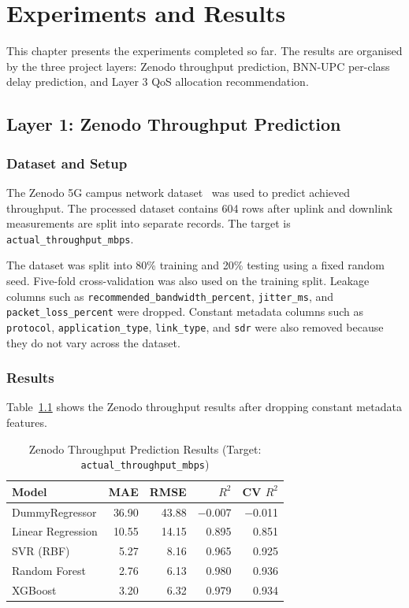 \documentclass[a4paper,12pt]{Classes/RoboticsLaTeX}
\begin{document}
\chapter{Experiments and Results}
\label{chap:results}

This chapter presents the experiments completed so far. The results are organised by the three project layers: Zenodo throughput prediction, BNN-UPC per-class delay prediction, and Layer 3 QoS allocation recommendation.

\section{Layer 1: Zenodo Throughput Prediction}

\subsection{Dataset and Setup}

The Zenodo 5G campus network dataset~\cite{raffeck2024zenodo} was used to predict achieved throughput. The processed dataset contains 604 rows after uplink and downlink measurements are split into separate records. The target is \texttt{actual\_throughput\_mbps}.

The dataset was split into 80\% training and 20\% testing using a fixed random seed. Five-fold cross-validation was also used on the training split. Leakage columns such as \texttt{recommended\_bandwidth\_percent}, \texttt{jitter\_ms}, and \texttt{packet\_loss\_percent} were dropped. Constant metadata columns such as \texttt{protocol}, \texttt{application\_type}, \texttt{link\_type}, and \texttt{sdr} were also removed because they do not vary across the dataset.

\subsection{Results}

Table~\ref{tab:zenodo_results} shows the Zenodo throughput results after dropping constant metadata features.

\begin{table}[H]
\centering
\caption[Zenodo Throughput Prediction Results]{Zenodo Throughput Prediction Results (Target: \texttt{actual\_throughput\_mbps})}
\label{tab:zenodo_results}
\begin{tabular}{|l|r|r|r|r|}
\hline
\textbf{Model} & \textbf{MAE} & \textbf{RMSE} & \textbf{$R^2$} & \textbf{CV $R^2$} \\
\hline
DummyRegressor & 36.90 & 43.88 & $-$0.007 & $-$0.011 \\
\hline
Linear Regression & 10.55 & 14.15 & 0.895 & 0.851 \\
\hline
SVR (RBF) & 5.27 & 8.16 & 0.965 & 0.925 \\
\hline
Random Forest & 2.76 & 6.13 & 0.980 & 0.936 \\
\hline
XGBoost & 3.20 & 6.32 & 0.979 & 0.934 \\
\hline
\end{tabular}
\end{table}
\end{document}
